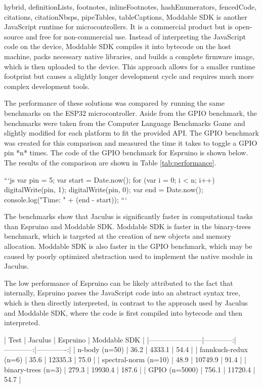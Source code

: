 \begin{markdown*}{%
  hybrid,
  definitionLists,
  footnotes,
  inlineFootnotes,
  hashEnumerators,
  fencedCode,
  citations,
  citationNbsps,
  pipeTables,
  tableCaptions,
}
Moddable SDK is another JavaScript runtime for microcontrollers. It is a commercial product but is open-source and free for non-commercial use. Instead of interpreting the JavaScript code on the device, Moddable SDK compiles it into bytecode on the host machine, packs necessary native libraries, and builds a complete firmware image, which is then uploaded to the device. This approach allows for a smaller runtime footprint but causes a slightly longer development cycle and requires much more complex development tools.

The performance of these solutions was compared by running the same benchmarks on the ESP32 microcontroller. Aside from the GPIO benchmark, the benchmarks were taken from the Computer Language Benchmarks Game\cite{bench-game} and slightly modified for each platform to fit the provided API. The GPIO benchmark was created for this comparison and measured the time it takes to toggle a GPIO pin *n* times. The code of the GPIO benchmark for Espruino is shown below. The results of the comparison are shown in Table \ref{tab:performance}.

```js
var pin = 5;
var start = Date.now();
for (var i = 0; i < n; i++) {
  digitalWrite(pin, 1);
  digitalWrite(pin, 0);
}
var end = Date.now();
console.log("Time: " + (end - start));
```

The benchmarks show that Jaculus is significantly faster in computational tasks than Espruino and Moddable SDK. Moddable SDK is faster in the binary-trees benchmark, which is targeted at the creation of new objects and memory allocation. Moddable SDK is also faster in the GPIO benchmark, which may be caused by poorly optimized abstraction used to implement the native module in Jaculus.

The low performance of Espruino can be likely attributed to the fact that internally, Espruino parses the JavaScript code into an abstract syntax tree, which is then directly interpreted, in contrast to the approach used by Jaculus and Moddable SDK, where the code is first compiled into bytecode and then interpreted.


\begin{table}[ht]
  \centering

  | Test                  | Jaculus     | Espruino    | Moddable SDK |
  |-----------------------|------------:|------------:|-------------:|
  | n-body (n=50)         | 36.2        | 4333.1      | 54.4         |
  | fannkuch-redux (n=6)  | 35.6        | 12335.3     | 75.0         |
  | spectral-norm (n=10)  | 48.9        | 10749.9     | 91.4         |
  | binary-trees (n=3)    | 279.3       | 19930.4     | 187.6        |
  | GPIO (n=5000)         | 756.1       | 11720.4     | 54.7         |


\end{table}
\end{markdown*}
